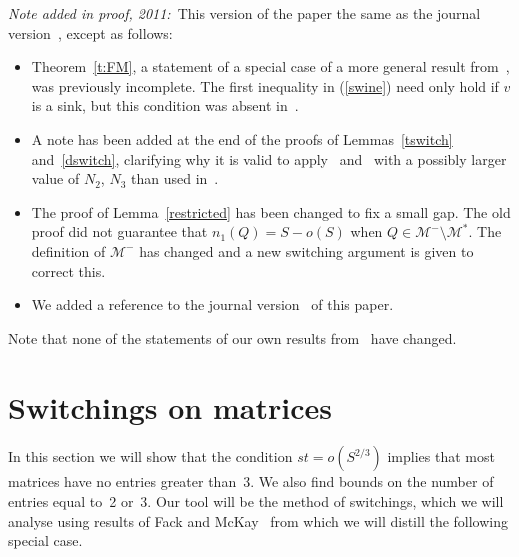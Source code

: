 \documentclass[12pt]{article}
\numberwithin{equation}{section}
\begin{document}
\emph{Note added in proof, 2011:}\ This version of the paper
the same as the journal version~\cite{GM08}, except as follows:
\begin{itemize}
\item 
Theorem~\ref{t:FM}, a statement of a special case of a more
general result from~\cite{FM}, was previously incomplete.  The
first inequality in (\ref{swine}) need only hold if $v$ is a sink,
but this condition was absent in~\cite{GM08}.
\item A note has been added at the end of the proofs of Lemmas~\ref{tswitch}
and~\ref{dswitch}, clarifying why it is valid to apply~\cite[Lemma 4.6]{GMW}
and~\cite[Lemma 4.8]{GMW} with a possibly larger value of $N_2$,
$N_3$ than used in~\cite{GMW}.
\item The proof of Lemma~\ref{restricted} has been changed to fix a small gap.
The old proof did not guarantee that $n_1(Q) = S - o(S)$
when $Q\in\mathcal{M}^-\setminus \mathcal{M}^\ast$.
The definition of $\mathcal{M}^-$ has changed and a new switching
argument is given to correct this.
\item We added a reference to the journal version~\cite{GM08} of this
paper.
\end{itemize}
Note that none of the statements of our own results from~\cite{GM08}
have changed.

\section{Switchings on matrices}\label{s:matrices}

In this section we will show
that the condition $st=o(S^{2/3})$ implies that most matrices
have no entries greater than~3.  We also find bounds on the
number of entries equal to~2 or~3.
Our tool will be the method of switchings, which we will
analyse using results of
Fack and McKay~\cite{FM} from which we
will distill the following special case.
\end{document}
